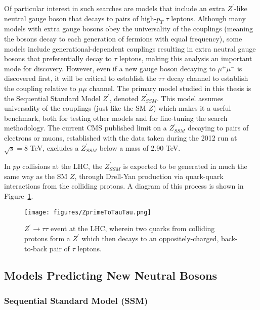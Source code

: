 Of particular interest in such searches are models that include an extra $Z^\prime$-like neutral gauge boson that decays to pairs of high-$p_{T}$ $\tau$ leptons. Although many models with extra gauge bosons obey the universality of the couplings (meaning the bosons decay to each generation of fermions with equal frequency), some models include generational-dependent couplings resulting in extra neutral gauge bosons that preferentially decay to $\tau$ leptons, making this analysis an important mode for discovery. However, even if a new gauge boson decaying to $\mu^+\mu^-$ is discovered first, it will be critical to establish the $\tau\tau$ decay channel to establish the coupling relative to $\mu\mu$ channel. The primary model studied in this thesis is the Sequential Standard Model $Z^\prime$, denoted $Z^{\prime}_{SSM}$. This model assumes universality of the couplings (just like the SM $Z$) which makes it a useful benchmark, both for testing other models and for fine-tuning the search methodology. The current CMS published limit on a $Z^{\prime}_{SSM}$ decaying to pairs of electrons or muons, established with the data taken during the 2012 run at $\sqrt{s} = 8$ TeV, excludes a $Z^{\prime}_{SSM}$ below a mass of 2.90 TeV.\cite{ZprimeToEE}

In $pp$ collisions at the LHC, the $Z^\prime_{SSM}$ is expected to be generated in much the same way as the SM $Z$, through Drell-Yan production via quark-quark interactions from the colliding protons. A diagram of this process is shown in Figure~\ref{fig:ZprimeToTauTau}.

\begin{figure}
\centering
  \texttt{[image: figures/ZprimeToTauTau.png]}
  \caption{\label{fig:ZprimeToTauTau} $Z^\prime \to \tau\tau$ event at the LHC, wherein two quarks from colliding protons form a $Z^\prime$ which then decays to an oppositely-charged, back-to-back pair of $\tau$ leptons.}
\end{figure}

\subsection{Models Predicting New Neutral Bosons}

\subsubsection{Sequential Standard Model (SSM)}


